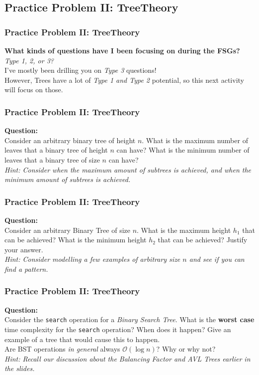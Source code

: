 \documentclass[hyperref={colorlinks,citecolor=blue,linkcolor=blue,urlcolor=blue}, aspectratio=1610]{beamer}
\begin{document}
\subsection{Practice Problem II: TreeTheory}
\begin{frame}
  \frametitle{Practice Problem II: TreeTheory}
  
  \textbf{What kinds of questions have I been focusing on during the FSGs?} \\
  \textit{Type 1, 2, or 3?} \\
  I've mostly been drilling you on \textit{Type 3} questions! \\
  However, Trees have a lot of \textit{Type 1 and Type 2} potential, so this next activity will focus on those.\\
\end{frame}

\begin{frame}
  \frametitle{Practice Problem II: TreeTheory}
  \textbf{Question:} \\
  Consider an arbitrary binary tree of height $n$. What is the maximum number of leaves that a binary tree of height $n$ can have? What is the minimum number of leaves that a binary tree of size $n$ can have? \\
  \textit{Hint: Consider when the maximum amount of subtrees is achieved, and when the minimum amount of subtrees is achieved.}
\end{frame}

\begin{frame}
  \frametitle{Practice Problem II: TreeTheory}
  \textbf{Question:} \\
  Consider an arbitrary Binary Tree of size $n$. What is the maximum height $h_1$ that can be achieved? What is the minimum height $h_2$ that can be achieved? Justify your answer. \\
  \textit{Hint: Consider modelling a few examples of arbitrary size $n$ and see if you can find a pattern.}
\end{frame}

\begin{frame}
  \frametitle{Practice Problem II: TreeTheory}
  \textbf{Question:} \\
  Consider the \texttt{search} operation for a \textit{Binary Search Tree}. What is the \textbf{worst case} time complexity for the \texttt{search} operation? When does it happen? Give an example of a tree that would cause this to happen. \\
  Are BST operations \textit{in general} always $\mathcal{O}(\log n)$? Why or why not? \\
  \textit{Hint: Recall our discussion about the \textit{Balancing Factor} and \textit{AVL Trees} earlier in the slides.}
\end{frame}
\end{document}
